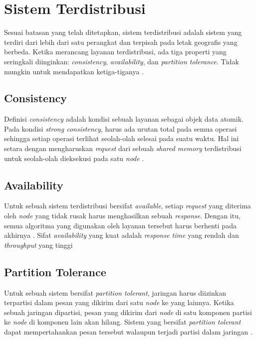 \section{Sistem Terdistribusi}

Sesuai batasan yang telah ditetapkan, sistem terdistribusi adalah sistem yang terdiri dari lebih dari satu perangkat dan terpisah pada letak geografis yang berbeda. Ketika merancang layanan terdistribusi, ada tiga properti yang seringkali diinginkan: \textit{consistency}, \textit{availability}, dan \textit{partition tolerance}. Tidak mungkin untuk mendapatkan ketiga-tiganya \parencite{gilbert2002brewer}.

\subsection{Consistency}

Definisi \textit{consistency} adalah kondisi sebuah layanan sebagai objek data atomik. Pada kondisi \textit{strong consistency}, harus ada urutan total pada semua operasi sehingga setiap operasi terlihat seolah-olah selesai pada suatu waktu. Hal ini setara dengan mengharuskan \textit{request} dari sebuah \textit{shared memory} terdistribusi untuk seolah-olah dieksekusi pada satu \textit{node} \parencite{gilbert2002brewer}.

\subsection{Availability}

Untuk sebuah sistem terdistribusi bersifat \textit{available}, setiap \textit{request} yang diterima oleh \textit{node} yang tidak rusak harus menghasilkan sebuah \textit{response}. Dengan itu, semua algoritma yang digunakan oleh layanan tersebut harus berhenti pada akhirnya \parencite{gilbert2002brewer}. Sifat \textit{availability} yang kuat adalah \textit{response time} yang rendah dan \textit{throughput} yang tinggi

\subsection{Partition Tolerance}

Untuk sebuah sistem bersifat \textit{partition tolerant}, jaringan harus diizinkan terpartisi dalam pesan yang dikirim dari satu \textit{node} ke yang lainnya. Ketika sebuah jaringan dipartisi, pesan yang dikirim dari \textit{node} di satu komponen partisi ke \textit{node} di komponen lain akan hilang. Sistem yang bersifat \textit{partition tolerant} dapat mempertahankan pesan tersebut walaupun terjadi partisi dalam jaringan \parencite{gilbert2002brewer}.